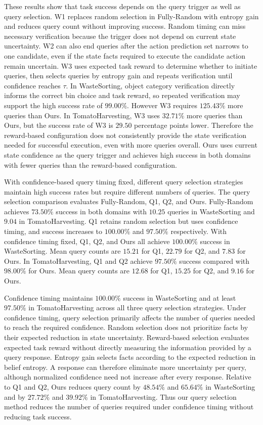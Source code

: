 These results show that task success depends on the query trigger as well as query selection. W1 replaces random selection in Fully-Random with entropy gain and reduces query count without improving success. Random timing can miss necessary verification because the trigger does not depend on current state uncertainty. W2 can also end queries after the action prediction set narrows to one candidate, even if the state facts required to execute the candidate action remain uncertain. W3 uses expected task reward to determine whether to initiate queries, then selects queries by entropy gain and repeats verification until confidence reaches $\tau$. In WasteSorting, object category verification directly informs the correct bin choice and task reward, so repeated verification may support the high success rate of $99.00\%$. However W3 requires $125.43\%$ more queries than Ours. In TomatoHarvesting, W3 uses $32.71\%$ more queries than Ours, but the success rate of W3 is $29.50$ percentage points lower. Therefore the reward-based configuration does not consistently provide the state verification needed for successful execution, even with more queries overall. Ours uses current state confidence as the query trigger and achieves high success in both domains with fewer queries than the reward-based configuration.

With confidence-based query timing fixed, different query selection strategies maintain high success rates but require different numbers of queries. The query selection comparison evaluates Fully-Random, Q1, Q2, and Ours. Fully-Random achieves $73.50\%$ success in both domains with $10.25$ queries in WasteSorting and $9.04$ in TomatoHarvesting. Q1 retains random selection but uses confidence timing, and success increases to $100.00\%$ and $97.50\%$ respectively. With confidence timing fixed, Q1, Q2, and Ours all achieve $100.00\%$ success in WasteSorting. Mean query counts are $15.21$ for Q1, $22.79$ for Q2, and $7.83$ for Ours. In TomatoHarvesting, Q1 and Q2 achieve $97.50\%$ success compared with $98.00\%$ for Ours. Mean query counts are $12.68$ for Q1, $15.25$ for Q2, and $9.16$ for Ours.

Confidence timing maintains $100.00\%$ success in WasteSorting and at least $97.50\%$ in TomatoHarvesting across all three query selection strategies. Under confidence timing, query selection primarily affects the number of queries needed to reach the required confidence. Random selection does not prioritize facts by their expected reduction in state uncertainty. Reward-based selection evaluates expected task reward without directly measuring the information provided by a query response. Entropy gain selects facts according to the expected reduction in belief entropy. A response can therefore eliminate more uncertainty per query, although normalized confidence need not increase after every response. Relative to Q1 and Q2, Ours reduces query count by $48.54\%$ and $65.64\%$ in WasteSorting and by $27.72\%$ and $39.92\%$ in TomatoHarvesting. Thus our query selection method reduces the number of queries required under confidence timing without reducing task success.

